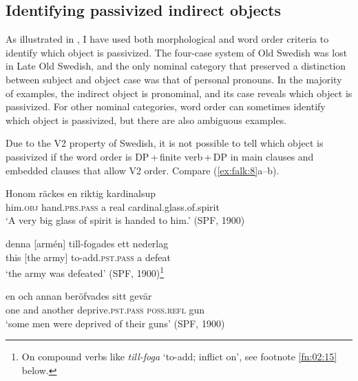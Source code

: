 \documentclass[output=paper]{langscibook}
\begin{document}
\subsection{Identifying passivized indirect objects}\label{sec:falk:3.2}


As illustrated in , I have used both morphological and word order criteria to identify which object is passivized. The four-case system of Old Swedish was lost in Late Old Swedish, and the only nominal category that preserved a distinction between subject and object case was that of personal pronouns. In the majority of examples, the indirect object is pronominal, and its case reveals which object is passivized. For other nominal categories, word order can sometimes identify which object is passivized, but there are also ambiguous examples.


Due to the V2 property of Swedish, it is not possible to tell which object is passivized if the word order is DP\,+\,finite verb\,+\,DP in main clauses and embedded clauses that allow V2 order. Compare (\ref{ex:falk:8}a–b).


\ea%
    \label{ex:falk:8}
\ea \label{ex:falk:8a}
\gll Honom  räckes        en    riktig  kardinalsup\\
      him.\textsc{obj}  hand\textsc{.prs}.\textsc{pass}  a      real   cardinal.glass.of.spirit\\
\glt ‘A very big glass of spirit is handed to him.’ (SPF, 1900)

\ex \label{ex:falk:8b}
\gll denna [armén]    till-fogades      ett  nederlag\\
      this {[the army]}    to-add.\textsc{pst}.\textsc{pass}  a   defeat\\
\glt       ‘the army was defeated’ (SPF, 1900)\footnote{On compound verbs like \textit{till-foga} ‘to-add; inflict on’, see footnote \ref{fn:02:15} below.}

\ex \label{ex:falk:8c}
\gll en    och  annan  beröfvades      sitt      gevär\\
      one  and  another  deprive\textsc{.pst}.\textsc{pass}  \textsc{poss.refl}  gun\\
\glt ‘some men were deprived of their guns’ (SPF, 1900)
\z
\z
\end{document}
